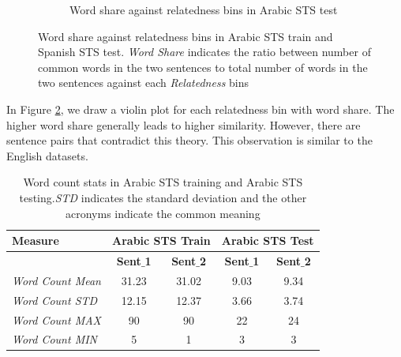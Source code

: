 \begin{enumerate}
\begin{figure}
\begin{subfigure}[b]{.5\textwidth}
		\caption{Word share against relatedness bins in Arabic STS test}
		\label{fig:arabic_sts_test_word_share}
	\end{subfigure}
	\caption[Word share against relatedness bins in Arabic STS train and Arabic STS test.]{Word share against relatedness bins in Arabic STS train and Spanish STS test. \textit{Word Share} indicates the ratio between number of common words in the two sentences to total number of words in the two sentences against each \textit{Relatedness} bins}
	\label{fig:arabic_sts_word_share}
\end{figure}

In Figure \ref{fig:arabic_sts_word_share}, we draw a violin plot for each relatedness bin with word share. The higher word share generally leads to higher similarity. However, there are sentence pairs that contradict this theory. This observation is similar to the English datasets. 


\begin{table}
	\centering
	\begin{tabular}{l|cc|cc}
		\hline
		Measure   & \multicolumn{2}{c|}{Arabic STS Train} & \multicolumn{2}{c}{Arabic STS Test} \\
		\hline
		\multicolumn{1}{l|}{} & \textbf{Sent$\_$1} & \textbf{Sent$\_$2} & \textbf{Sent$\_$1} & \textbf{Sent$\_$2} \\
		\textit{Word Count Mean} & 31.23 & 31.02 & 9.03 & 9.34  \\
		\textit{Word Count STD} & 12.15 & 12.37 & 3.66 & 3.74  \\
		\textit{Word Count MAX} & 90 & 90 & 22 & 24  \\
		\textit{Word Count MIN} & 5 & 1 & 3 & 3  \\
		\hline
	\end{tabular}
	\caption[Word count stats in Arabic STS]{Word count stats in Arabic STS training and Arabic STS testing.\textit{STD} indicates the standard deviation and the other acronyms indicate the common meaning }
	\label{table:arabic_sts}
\end{table}	


\end{enumerate}
